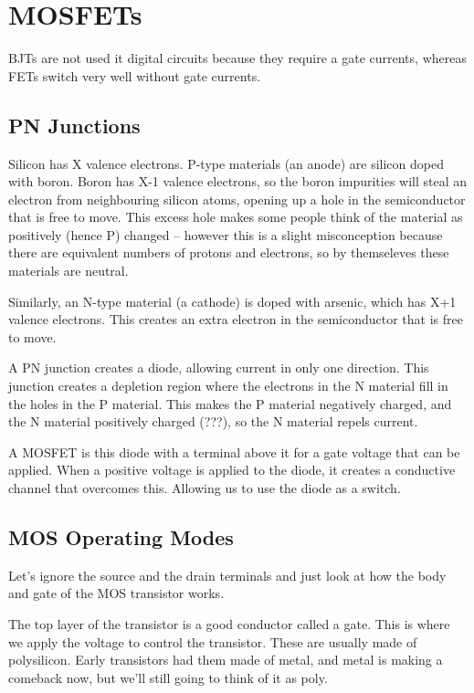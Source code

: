 \documentclass{article}
\begin{document}
\section{MOSFETs}

BJTs are not used it digital circuits because they require a gate  currents, whereas FETs switch very well without gate currents.

\subsection{PN Junctions}

Silicon has X valence electrons. P-type materials (an anode) are silicon doped with boron. Boron has X-1 valence electrons, so the boron impurities will steal an electron from neighbouring silicon atoms, opening up a hole in the semiconductor that is free to move. This excess hole makes some people think of the material as positively (hence P) changed -- however this is a slight misconception because there are equivalent numbers of protons and electrons, so by themseleves these materials are neutral.

Similarly, an N-type material (a cathode) is doped with arsenic, which has X+1 valence electrons. This creates an extra electron in the semiconductor that is free to move. 

A PN junction creates a diode, allowing current in only one direction. This junction creates a depletion region where the electrons in the N material fill in the holes in the P material. This makes the P material negatively charged, and the N material positively charged (???), so the N material repels current. 

A MOSFET is this diode with a terminal above it for a gate voltage that can be applied. When a positive voltage is applied to the diode, it creates a conductive channel that overcomes this. Allowing us to use the diode as a switch. 

\subsection{MOS Operating Modes}

Let's ignore the source and the drain terminals and just look at how the body and gate of the MOS transistor works. 

The top layer of the transistor is a good conductor called a gate. This is where we apply the voltage to control the transistor. These are usually made of polysilicon. Early transistors had them made of metal, and metal is making a comeback now, but we'll still going to think of it as poly. 
\end{document}
